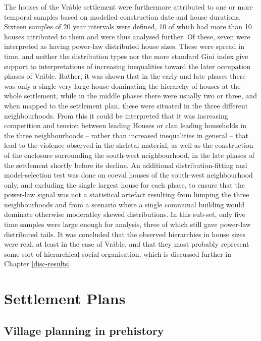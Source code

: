 \documentclass[
  12pt,
]{book}
\begin{document}
The houses of the Vráble settlement were furthermore attributed to one or more temporal samples based on modelled construction date and house durations. Sixteen samples of 20 year intervals were defined, 10 of which had more than 10 houses attributed to them and were thus analysed further. Of these, seven were interpreted as having power-law distributed house sizes. These were spread in time, and neither the distribution types nor the more standard Gini index give support to interpretations of increasing inequalities toward the later occupation phases of Vráble. Rather, it was shown that in the early and late phases there was only a single very large house dominating the hierarchy of houses at the whole settlement, while in the middle phases there were usually two or three, and when mapped to the settlement plan, these were situated in the three different neighbourhoods. From this it could be interpreted that it was increasing competition and tension between leading Houses or clan leading households in the three neighbourhoods -- rather than increased inequalities in general -- that lead to the violence observed in the skeletal material, as well as the construction of the enclosure surrounding the south-west neighbourhood, in the late phases of the settlement shortly before its decline. An additional distribution-fitting and model-selection test was done on coeval houses of the south-west neighbourhood only, and excluding the single largest house for each phase, to ensure that the power-law signal was not a statistical artefact resulting from lumping the three neighbourhoods and from a scenario where a single communal building would dominate otherwise moderatley skewed distributions. In this sub-set, only five time samples were large enough for analysis, three of which still gave power-law distributed tails. It was concluded that the observed hierarchies in house sizes were real, at least in the case of Vráble, and that they most probably represent some sort of hierarchical social organisation, which is discussed further in Chapter \ref{disc-results}.

\hypertarget{part-settlement-plans}{%
\part{Settlement Plans}\label{part-settlement-plans}}

\hypertarget{images-theory}{%
\chapter{Village planning in prehistory}\label{images-theory}}
\end{document}
